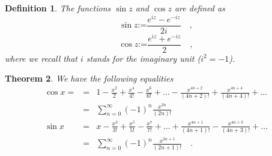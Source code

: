 \documentclass[12pt]{book}
\newcommand{\eqdef}{\textbf{:=}}
\newcommand{\importantFormula}[1]{\begin{equation} \boxed{#1} \end{equation}}
\newtheorem{theorem}{Theorem}[section]
\newtheorem{definition}[theorem]{Definition}
\begin{document}
\begin{definition}
The functions $\sin z$ and $\cos z$ are defined as
\importantFormula{
\sin z\eqdef \frac{e^{iz}-e^{-iz}}{2i} \quad ,
}
\importantFormula{
\cos z\eqdef \frac{e^{iz}+e^{-iz}}{2}\quad ,
}
where we recall that $i$ stands for the imaginary unit ($i^2=-1$).
\end{definition} 
\begin{theorem}\label{thSinCosMaclaurinSeries} We have the following equalities
\begin{equation}\label{eqSinCosMaclaurinSeries}
\begin{array}{rcl}
\cos x= &=&1-\frac{x^2}{2}+ \frac{x^4}{4!}- \frac{x^6}{6!} +\dots - \frac{x^{4n+2}}{(4n+2)!}+ \frac{x^{4n+4}}{ (4n+4)!} +\dots\\
&=& \displaystyle \sum_{n=0}^\infty (-1)^n \frac{x^{2n} }{ (2n)!} \\
\sin x& =& x-\frac{x^3}{3!}+ \frac{x^5}{5!}- \frac{x^7}{7!} +\dots + \frac{x^{4n+1}}{(4n+1 )!}- \frac{x^{4n+3}}{ (4n+3)!} +\dots\\
&=&\displaystyle \sum_{n=0}^{\infty}(-1)^n \frac{x^{2n+1}}{ (2n+1)!} \quad .
\end{array}
\end{equation}
\end{theorem}
\end{document}
